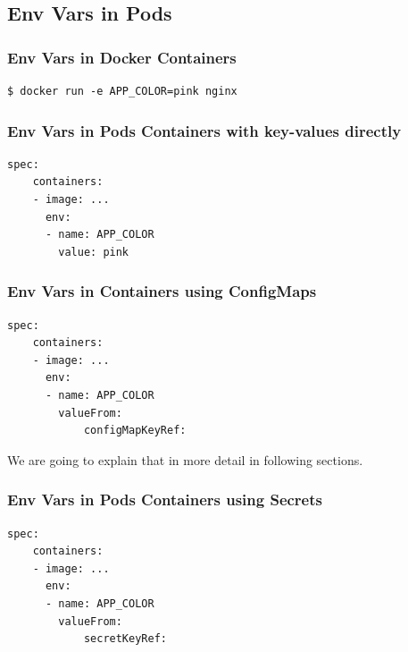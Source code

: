 \documentclass{article}
\newenvironment{codetemplate}[1][]{%
  \mybasecolorbox[#1]
  \itshape
}{%
  \endmybasecolorbox
}
\begin{document}
\subsection{Env Vars in Pods}

\subsubsection{Env Vars in Docker Containers}
\begin{codetemplate}{}
\begin{verbatim}
$ docker run -e APP_COLOR=pink nginx
\end{verbatim}
\end{codetemplate}

\subsubsection{Env Vars in Pods Containers with key-values directly}
\begin{codetemplate}{}
\begin{verbatim}
spec:
    containers:
    - image: ...
      env:
      - name: APP_COLOR
        value: pink
\end{verbatim}
\end{codetemplate}

\subsubsection{Env Vars in  Containers using ConfigMaps}
\begin{codetemplate}{}
\begin{verbatim}
spec:
    containers:
    - image: ...
      env:
      - name: APP_COLOR
        valueFrom:
            configMapKeyRef:
\end{verbatim}
\end{codetemplate}

We are going to explain that in more detail in following sections.

\subsubsection{Env Vars in Pods Containers using Secrets}
\begin{codetemplate}{}
\begin{verbatim}
spec:
    containers:
    - image: ...
      env:
      - name: APP_COLOR
        valueFrom:
            secretKeyRef:
\end{verbatim}
\end{codetemplate}
\end{document}
